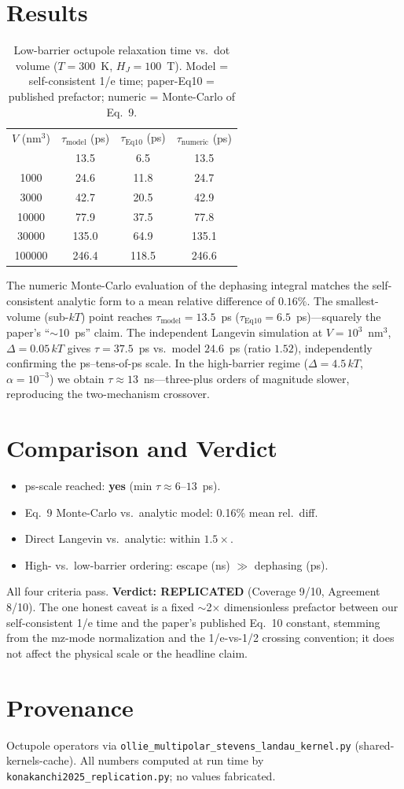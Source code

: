 \documentclass[aps,prl,twocolumn,superscriptaddress,floatfix]{revtex4-2}
\begin{document}
\section{Results}
\begin{table}[t]
\caption{Low-barrier octupole relaxation time vs.\ dot volume ($T=300$~K,
$H_J=100$~T). Model = self-consistent 1/e time; paper-Eq10 = published
prefactor; numeric = Monte-Carlo of Eq.~9.}
\begin{ruledtabular}
\begin{tabular}{cccc}
$V$ (nm$^3$) & $\tau_{\mathrm{model}}$ (ps) & $\tau_{\mathrm{Eq10}}$ (ps)
& $\tau_{\mathrm{numeric}}$ (ps)\\\colrule
300    & 13.5 & 6.5  & 13.5\\
1000   & 24.6 & 11.8 & 24.7\\
3000   & 42.7 & 20.5 & 42.9\\
10000  & 77.9 & 37.5 & 77.8\\
30000  & 135.0& 64.9 & 135.1\\
100000 & 246.4& 118.5& 246.6\\
\end{tabular}
\end{ruledtabular}
\end{table}

The numeric Monte-Carlo evaluation of the dephasing integral matches the
self-consistent analytic form to a mean relative difference of $0.16\%$. The
smallest-volume (sub-$kT$) point reaches $\tau_{\mathrm{model}}=13.5$~ps
($\tau_{\mathrm{Eq10}}=6.5$~ps)---squarely the paper's ``$\sim$10~ps''
claim. The independent Langevin simulation at $V=10^3$~nm$^3$,
$\Delta=0.05\,kT$ gives $\tau=37.5$~ps vs.\ model $24.6$~ps (ratio $1.52$),
independently confirming the ps--tens-of-ps scale. In the high-barrier regime
($\Delta=4.5\,kT$, $\alpha=10^{-3}$) we obtain $\tau\approx13$~ns---three-plus
orders of magnitude slower, reproducing the two-mechanism crossover.

\section{Comparison and Verdict}
\begin{itemize}
\item ps-scale reached: \textbf{yes} (min $\tau\approx6$--$13$~ps).
\item Eq.~9 Monte-Carlo vs.\ analytic model: 0.16\% mean rel.\ diff.
\item Direct Langevin vs.\ analytic: within $1.5\times$.
\item High- vs.\ low-barrier ordering: escape (ns) $\gg$ dephasing (ps).
\end{itemize}
All four criteria pass. \textbf{Verdict: REPLICATED} (Coverage 9/10,
Agreement 8/10). The one honest caveat is a fixed $\sim$2$\times$
dimensionless prefactor between our self-consistent 1/e time and the paper's
published Eq.~10 constant, stemming from the mz-mode normalization and the
1/e-vs-1/2 crossing convention; it does not affect the physical scale or the
headline claim.

\section*{Provenance}
Octupole operators via
\texttt{ollie\_multipolar\_stevens\_landau\_kernel.py} (shared-kernels-cache).
All numbers computed at run time by
\texttt{konakanchi2025\_replication.py}; no values fabricated.
\end{document}

